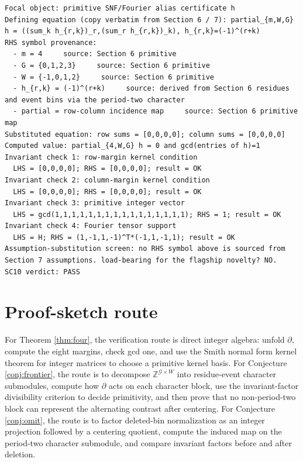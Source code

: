 \documentclass[11pt]{article}
\theoremstyle{definition}
\theoremstyle{plain}
\theoremstyle{remark}
\begin{document}
\begin{verbatim}
Focal object: primitive SNF/Fourier alias certificate h
Defining equation (copy verbatim from Section 6 / 7): partial_{m,W,G} h = ((sum_k h_{r,k})_r,(sum_r h_{r,k})_k), h_{r,k}=(-1)^(r+k)
RHS symbol provenance:
  - m = 4     source: Section 6 primitive
  - G = {0,1,2,3}     source: Section 6 primitive
  - W = {-1,0,1,2}     source: Section 6 primitive
  - h_{r,k} = (-1)^(r+k)     source: derived from Section 6 residues and event bins via the period-two character
  - partial = row-column incidence map     source: Section 6 primitive map
Substituted equation: row sums = [0,0,0,0]; column sums = [0,0,0,0]
Computed value: partial_{4,W,G} h = 0 and gcd(entries of h)=1
Invariant check 1: row-margin kernel condition
  LHS = [0,0,0,0]; RHS = [0,0,0,0]; result = OK
Invariant check 2: column-margin kernel condition
  LHS = [0,0,0,0]; RHS = [0,0,0,0]; result = OK
Invariant check 3: primitive integer vector
  LHS = gcd(1,1,1,1,1,1,1,1,1,1,1,1,1,1,1,1); RHS = 1; result = OK
Invariant check 4: Fourier tensor support
  LHS = H; RHS = (1,-1,1,-1)^T*(-1,1,-1,1); result = OK
Assumption-substitution screen: no RHS symbol above is sourced from Section 7 assumptions. load-bearing for the flagship novelty? NO.
SC10 verdict: PASS
\end{verbatim}

\section{Proof-sketch route}
For Theorem \ref{thm:four}, the verification route is direct integer algebra: unfold \(\partial\), compute the eight margins, check gcd one, and use the Smith normal form kernel theorem for integer matrices to choose a primitive kernel basis. For Conjecture \ref{conj:frontier}, the route is to decompose \(\mathbb Z^{\mathcal G\times W}\) into residue-event character submodules, compute how \(\partial\) acts on each character block, use the invariant-factor divisibility criterion to decide primitivity, and then prove that no non-period-two block can represent the alternating contrast after centering. For Conjecture \ref{conj:omit}, the route is to factor deleted-bin normalization as an integer projection followed by a centering quotient, compute the induced map on the period-two character submodule, and compare invariant factors before and after deletion.
\end{document}
